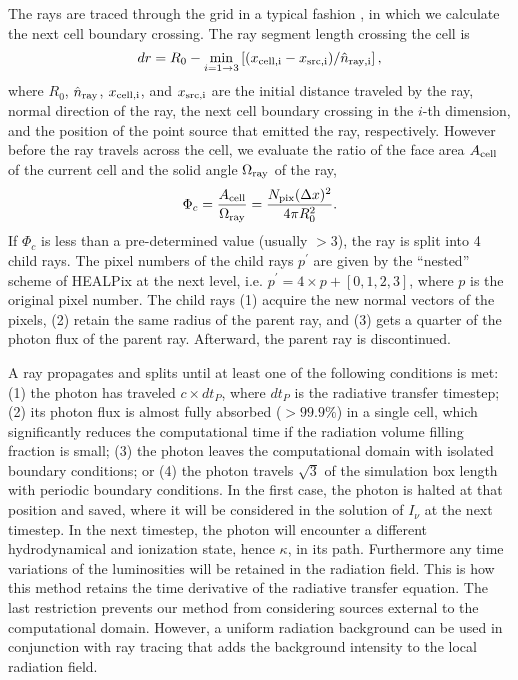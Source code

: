 The rays are traced through the grid in a typical fashion
\citep[e.g.][]{Abel99_RT}, in which we calculate the next cell
boundary crossing.  The ray segment length crossing the cell is
%
\begin{equation}
  \label{eqn:trace}
  dr = R_0 - \min_{i=1 \rightarrow 3} \left[(x_{\rm cell,i} - x_{\rm src,i}) /
    \hat{n}_{\rm ray,i} \right],
\end{equation}
%
where $R_0$, $\hat{n}_{\rm ray}$, $x_{\rm cell,i}$, and $x_{\rm
  src,i}$ are the initial distance traveled by the ray, normal
direction of the ray, the next cell boundary crossing in the $i$-th
dimension, and the position of the point source that emitted the ray,
respectively.  However before the ray travels across the cell, we
evaluate the ratio of the face area $A_{\rm cell}$ of the current cell
and the solid angle $\Omega_{\rm ray}$ of the ray,
%
\begin{equation}
  \label{eqn:split}
  \Phi_c = \frac{A_{\rm cell}} {\Omega_{\rm ray}} = 
  \frac{N_{\rm pix} (\Delta x)^2} {4\pi R_0^2}.
\end{equation}
%
If $\Phi_c$ is less than a pre-determined value (usually $>3$), the
ray is split into 4 child rays.  The pixel numbers of the child rays
$p^\prime$ are given by the ``nested'' scheme of HEALPix at the next
level, i.e. $p^\prime = 4 \times p + [0,1,2,3]$, where $p$ is the
original pixel number.  The child rays (1) acquire the new normal
vectors of the pixels, (2) retain the same radius of the parent ray,
and (3) gets a quarter of the photon flux of the parent ray.
Afterward, the parent ray is discontinued.

A ray propagates and splits until at least one of the following conditions is met: (1) the photon has traveled $c
\times dt_P$, where $dt_P$ is the radiative transfer timestep; (2) its
photon flux is almost fully absorbed ($>99.9\%$) in a single cell,
which significantly reduces the computational time if the radiation
volume filling fraction is small; (3) the photon leaves the
computational domain with isolated boundary conditions; or (4) the
photon travels $\sqrt{3}$ of the simulation box length with periodic
boundary conditions.
In the first case, the photon is halted at that position and saved,
where it will be considered in the solution of $I_\nu$ at the next
timestep.  In the next timestep, the photon will encounter a different
hydrodynamical and ionization state, hence $\kappa$, in its path.
Furthermore any time variations of the luminosities will be retained
in the radiation field.  This is how this method retains the time
derivative of the radiative transfer equation.  The last restriction
prevents our method from considering sources external to the
computational domain. However, a uniform radiation background can be used
in conjunction with ray tracing that adds the background intensity to the
local radiation field. 

